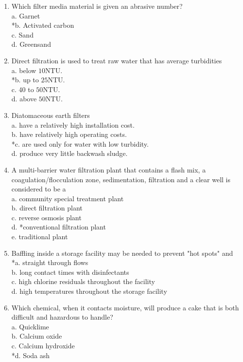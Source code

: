 \begin{enumerate}
  \item Which filter media material is given an abrasive number?\\
a. Garnet\\
*b. Activated carbon\\
c. Sand\\
d. Greensand\\


  \item Direct filtration is used to treat raw water that has average turbidities\\
a. below $10 \mathrm{NTU}$.\\
*b. up to $25 \mathrm{NTU}$.\\
c. 40 to $50 \mathrm{NTU}$.\\
d. above $50 \mathrm{NTU}$.\\

  \item Diatomaceous earth filters\\
a. have a relatively high installation cost.\\
b. have relatively high operating costs.\\
*c. are used only for water with low turbidity.\\
d. produce very little backwash sludge.\\


 \item A multi-barrier water filtration plant that contains a flash mix, a coagulation/flocculation zone, sedimentation, filtration and a clear well is considered to be a\\
a. community special treatment plant\\
b. direct filtration plant\\
c. reverse osmosis plant\\
d. *conventional filtration plant\\
e. traditional plant 

 \item Baffling inside a storage facility may be needed to prevent "hot spots" and\\
*a. straight through flows\\
b. long contact times with disinfectants\\
c. high chlorine residuals throughout the facility\\
d. high temperatures throughout the storage facility\\

  \item Which chemical, when it contacts moisture, will produce a cake that is both difficult and hazardous to handle?\\
a. Quicklime\\
b. Calcium oxide\\
c. Calcium hydroxide\\
*d. Soda ash\\


\end{enumerate}
